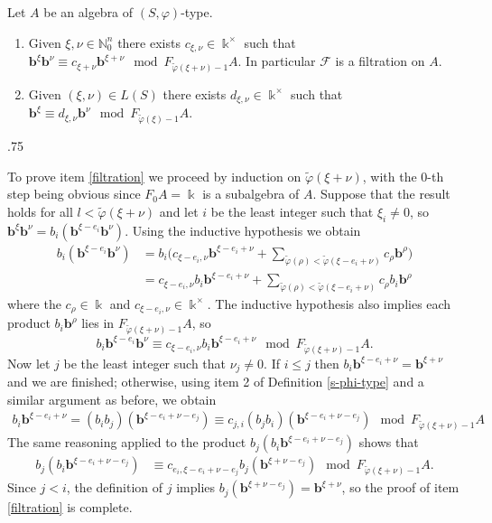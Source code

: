 \documentclass[11pt,fleqn]{article}
\makeatletter
\renewenvironment{proof}[1][\textit{Proof}]{\par
  \pushQED{\qed}%
  \normalfont \topsep.75\paraskip\relax
  \trivlist
  \item[\hskip\labelsep
        \itshape
    #1\@addpunct{.}]\ignorespaces
}{%
  \popQED\endtrivlist\@endpefalse
}
\newcommand\NN{\mathbb N}
\renewcommand\phi{\varphi}
\newcommand\F{\mathcal F}
\newcommand\tphi{\tilde \phi}
\renewcommand\b{\mathbf b}
\renewcommand\k{\Bbbk}
\makeatother
\begin{document}
\begin{Lemma*}
Let $A$ be an algebra of $(S, \phi)$-type.
\begin{enumerate}
\item \label{filtration}
Given $\xi, \nu \in \NN_0^n$ there exists $c_{\xi, \nu} \in \k^\times$ such that $\b^\xi
\b^\nu \equiv c_{\xi + \nu}\b^{\xi + \nu} \mod F_{\tphi(\xi + \nu) - 1}A$. In particular 
$\F$ is a filtration on $A$.

\item \label{straight}
Given $(\xi, \nu) \in L(S)$ there exists $d_{\xi, \nu} 
\in \k^\times$ such that $\b^\xi \equiv d_{\xi, \nu} \b^\nu \mod F_{\tphi(\xi) - 1} A$.
\end{enumerate}
\end{Lemma*}
\begin{proof}
To prove item \ref{filtration} we proceed by induction on $\tphi(\xi + \nu)$, with the
$0$-th step being obvious since $F_0A = \k$ is a subalgebra of $A$. Suppose that the
result holds for all $l < \tphi(\xi + \nu)$ and let $i$ be the least integer such that
$\xi_i \neq 0$, so $\b^\xi \b^\nu = b_i (\b^{\xi - e_i} \b ^\nu)$. Using the inductive
hypothesis we obtain
\begin{align*}
b_i (\b^{\xi - e_i} \b^\nu) 
&= b_i \bigg( c_{\xi- e_i, \nu} \b^{\xi - e_i + \nu} 
  + \sum_{\tphi(\rho) < \tphi(\xi - e_i + \nu)} c_\rho \b^\rho \bigg)\\
&= c_{\xi- e_i, \nu} b_i \b^{\xi - e_i + \nu} 
  + \sum_{\tphi(\rho) < \tphi(\xi - e_i + \nu)} c_\rho b_i \b^\rho
\end{align*}
where the $c_\rho \in \k$ and $c_{\xi - e_i,\nu} \in \k^\times$. The inductive  
hypothesis also implies each product $b_i \b^\rho$ lies in $F_{\tphi(\xi + \nu) -1} A$,
so
\[
  b_i \b^{\xi - e_i} \b^\nu \equiv c_{\xi- e_i, \nu}b_i \b^{\xi - e_i + \nu} \mod
  F_{\tphi(\xi + \nu)-1}A.
\]
Now let $j$ be the least integer such that $\nu_j \neq 0$. If $i \leq j$ then $b_i 
\b^{\xi - e_i + \nu} = \b^{\xi + \nu}$ and we are finished; otherwise, using item 2 of 
Definition \ref{s-phi-type} and a similar argument as before, we obtain
\begin{align*}
  b_i \b^{\xi - e_i + \nu} = (b_i b_j)(\b^{\xi - e_i + \nu - e_j}) \equiv c_{j,i} (b_j
  b_i)(\b^{\xi - e_i + \nu - e_j}) \mod F_{\tphi(\xi + \nu) - 1}A
\end{align*}
The same reasoning applied to the product $b_j(b_i\b^{\xi - e_i + \nu - e_j})$ shows that
\begin{align*}
  b_j (b_i \b^{\xi - e_i + \nu - e_j}) 
    &\equiv c_{e_i, \xi - e_i + \nu - e_j} b_j(\b^{\xi  + \nu - e_j}) \mod
  F_{\tphi(\xi + \nu) - 1}A.
\end{align*}
Since $j < i$, the definition of $j$ implies $b_j(\b^{\xi  + \nu - e_j}) = \b^{\xi + 
\nu}$, so the proof of item \ref{filtration} is complete.


\end{proof}
\end{document}
